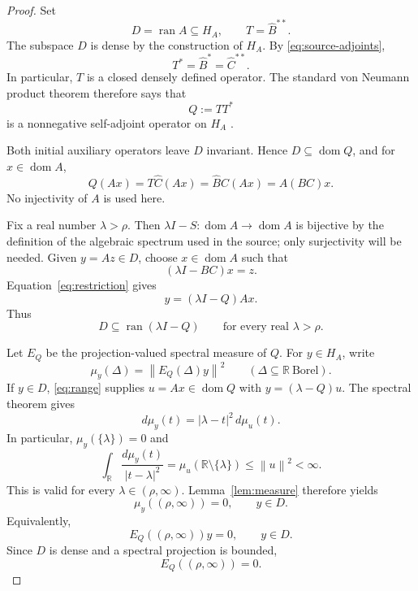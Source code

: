\documentclass[11pt]{article}
\newcommand{\R}{\mathbb R}
\newcommand{\Hh}{H_A}
\newcommand{\domA}{\operatorname{dom}A}
\newcommand{\ran}{\operatorname{ran}}
\newcommand{\norm}[1]{\left\lVert#1\right\rVert}
\begin{document}
\begin{proof}
Set
\[
 D=\ran A\subseteq\Hh,\qquad
 T=\widehat B^{**}.
\]
The subspace \(D\) is dense by the construction of \(\Hh\).  By
\eqref{eq:source-adjoints},
\[
 T^*=\widehat B^*=\widehat C^{**}.
\]
In particular, \(T\) is a closed densely defined operator.  The standard
von Neumann product theorem therefore says that
\begin{equation}\label{eq:Q}
 Q:=TT^*
\end{equation}
is a nonnegative self-adjoint operator on \(\Hh\)
\cite[Chapter~VIII]{RS}.

Both initial auxiliary operators leave \(D\) invariant.  Hence
\(D\subseteq\operatorname{dom}Q\), and for \(x\in\domA\),
\begin{equation}\label{eq:restriction}
 Q(Ax)
 =T\widehat C(Ax)
 =\widehat B\widehat C(Ax)
 =A(BC)x.
\end{equation}
No injectivity of \(A\) is used here.

Fix a real number \(\lambda>\rho\).  Then
\(\lambda I-S:\domA\to\domA\) is bijective by the definition of the
algebraic spectrum used in the source; only surjectivity will be needed.
Given \(y=Az\in D\), choose \(x\in\domA\) such that
\[
 (\lambda I-BC)x=z.
\]
Equation~\eqref{eq:restriction} gives
\begin{equation}\label{eq:range}
 y=(\lambda I-Q)Ax.
\end{equation}
Thus
\[
 D\subseteq\ran(\lambda I-Q)
 \qquad\text{for every real }\lambda>\rho.
\]

Let \(E_Q\) be the projection-valued spectral measure of \(Q\).  For
\(y\in\Hh\), write
\[
 \mu_y(\Delta)=\norm{E_Q(\Delta)y}^2
 \qquad(\Delta\subseteq\R\ \text{Borel}).
\]
If \(y\in D\), \eqref{eq:range} supplies \(u=Ax\in\operatorname{dom}Q\)
with \(y=(\lambda-Q)u\).  The spectral theorem gives
\[
 d\mu_y(t)=|\lambda-t|^2\,d\mu_u(t).
\]
In particular, \(\mu_y(\{\lambda\})=0\) and
\begin{equation}\label{eq:inverse-square}
 \int_{\R}\frac{d\mu_y(t)}{|t-\lambda|^2}
 =\mu_u(\R\setminus\{\lambda\})
 \le\norm{u}^2<\infty.
\end{equation}
This is valid for every \(\lambda\in(\rho,\infty)\).  Lemma~\ref{lem:measure}
therefore yields
\[
 \mu_y((\rho,\infty))=0,
 \qquad y\in D.
\]
Equivalently,
\[
 E_Q((\rho,\infty))y=0,\qquad y\in D.
\]
Since \(D\) is dense and a spectral projection is bounded,
\begin{equation}\label{eq:projection-zero}
 E_Q((\rho,\infty))=0.
\end{equation}


\end{proof}
\end{document}
